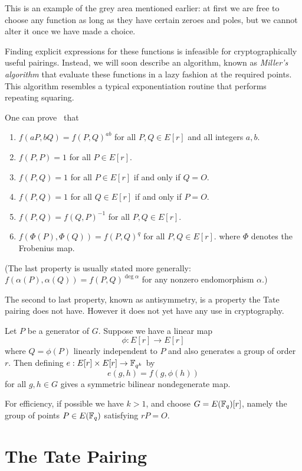 This is an example of the grey area mentioned earlier:
at first we are free to choose
any function as long as they have certain zeroes and poles, but we cannot
alter it once we have made a choice.

Finding explicit expressions for these functions is infeasible for
cryptographically useful pairings. Instead, we will soon describe
an algorithm, known as \emph{Miller's algorithm}
that evaluate these functions in a lazy fashion at the required
points. This algorithm resembles a typical exponentiation routine
that performs repeating squaring.

One can prove~\cite{silverman} that
\begin{enumerate}
\item
$f(a P, b Q) = f(P,Q)^{a b}$ for all $P, Q \in E[r]$ and all integers $a, b$.
\item
$f(P,P) = 1$ for all $P \in E[r]$.
\item
$f(P,Q) = 1$ for all $P \in E[r]$ if and only if $Q = O$.
\item
$f(P,Q) = 1$ for all $Q \in E[r]$ if and only if $P = O$.
\item
$f(P,Q) = f(Q,P)^{-1}$ for all $P,Q \in E[r]$.
\item
$f(\Phi(P),\Phi(Q)) = f(P,Q)^{q}$ for all $P,Q \in E[r]$.
where $\Phi$ denotes the Frobenius map.
\end{enumerate}

(The last property is usually stated more generally:
$f(\alpha(P),\alpha(Q)) = f(P,Q)^{\deg \alpha}$ for any nonzero
endomorphism $\alpha$.)

The second to last property, known as antisymmetry, is a property the
Tate pairing does not have. However it does not yet have
any use in cryptography.

Let $P$ be a generator of $G$. Suppose
we have a linear map
\[ \phi : E[r] \rightarrow E[r] \]
where $Q = \phi(P)$ linearly independent to $P$ and also generates
a group of order $r$.
Then defining $e:E[r]\times E[r]\rightarrow \mathbb{F}_{q^k}$ by
\[ e(g,h) = f(g,\phi(h)) \]
for all $g, h \in G$
gives a symmetric bilinear nondegenerate map.

For efficiency, if possible we have $k > 1$, and choose
$G = E(\mathbb{F}_q)[r]$, namely the
group of points $P \in E(\mathbb{F}_q)$ satisfying $r P = O$.

\section {The Tate Pairing }


